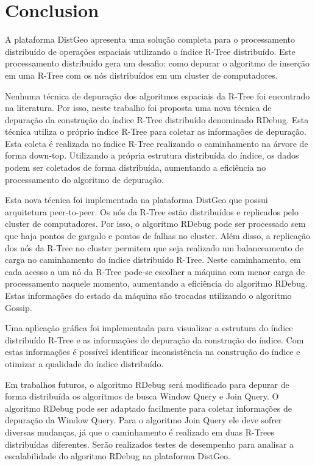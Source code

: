 \section{Conclusion}
\label{sec:conclusion}

A plataforma DistGeo apresenta uma solução completa para o processamento distribuído de operações
espaciais utilizando o índice R-Tree distribuído. Este processamento distribuído gera um desafio: como depurar o algoritmo de inserção em uma R-Tree com os nós distribuídos em um cluster de computadores. 

Nenhuma técnica de depuração dos algoritmos espaciais da R-Tree foi encontrado na literatura. Por isso, neste trabalho foi proposta uma nova técnica de depuração da construção do índice R-Tree distribuído denominado RDebug. Esta técnica utiliza o próprio índice R-Tree para coletar as informações de depuração. Esta coleta é realizada no índice R-Tree realizando o caminhamento na árvore de forma down-top. Utilizando a própria estrutura distribuída do índice, os dados podem ser coletados de forma distribuída, aumentando a eficiência no processamento do algoritmo de depuração.

Esta nova técnica foi implementada na plataforma DistGeo que possui arquitetura peer-to-peer. Os nós da R-Tree estão distribuídos e replicados pelo cluster de computadores. Por isso, o algoritmo RDebug pode ser processado sem que haja pontos de gargalo e pontos de falhas no cluster. Além disso, a replicação dos nós da R-Tree no cluster permitem que seja realizado um balanceamento de carga no caminhamento do índice distribuído R-Tree. Neste caminhamento, em cada acesso a um nó da R-Tree pode-se escolher a máquina com menor carga de processamento naquele momento, aumentando a eficiência do algoritmo RDebug. Estas informações do estado da máquina são trocadas utilizando o algoritmo Gossip.

Uma aplicação gráfica foi implementada para visualizar a estrutura do índice distribuído R-Tree e as informações de depuração da construção do índice. Com estas informações é possível identificar inconsistência na construção do índice e otimizar a qualidade do índice distribuído.

Em trabalhos futuros, o algoritmo RDebug será modificado para depurar de forma distribuída os algoritmos de busca Window Query e Join Query. O algoritmo RDebug pode ser adaptado facilmente para coletar informações de depuração da Window Query. Para o algoritmo Join Query ele deve sofrer diversas mudanças, já que o caminhamento é realizado em duas R-Trees distribuídas diferentes.
Serão realizados testes de desempenho para analisar a escalabilidade do algoritmo RDebug na plataforma DistGeo. 